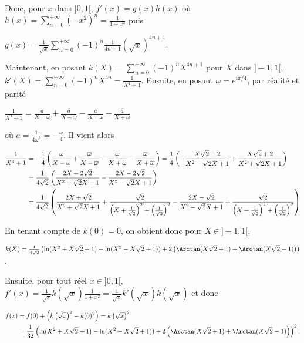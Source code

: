 {{Donc, pour $x$ dans $]0,1[$, $f'(x)  = g(x)h(x)$ où $h(x) =\sum_{n=0}^{+\infty}(-x^2)^n =\frac{1}{1+x^2}$ puis 

\begin{center}
$g(x) =\frac{1}{\sqrt{x}}\sum_{n=0}^{+\infty}(-1)^n\frac{1}{4n+1}(\sqrt{x})^{4n+1}$.
\end{center}

Maintenant, en posant $k(X)=\sum_{n=0}^{+\infty}(-1)^n X^{4n+1}$ pour $X$ dans $]-1,1[$, $k'(X)=\sum_{n=0}^{+\infty}(-1)^nX^{4n}=\frac{1}{X^4+1}$. Ensuite, en posant $\omega=e^{i\pi/4}$, par réalité et parité

\begin{center}
$\frac{1}{X^4+1}=\frac{a}{X-\omega}+\frac{\overline{a}}{X-\overline{\omega}}-\frac{a}{X+\omega}-\frac{\overline{a}}{X+\overline{\omega}}$
\end{center}

où $a=\frac{1}{4\omega^3}=-\frac{\omega}{4}$. Il vient alors

\begin{align*}\ensuremath
\frac{1}{X^4+1}&=-\frac{1}{4}\left(\frac{\omega}{X-\omega}+\frac{\overline{\omega}}{X-\overline{\omega}}-\frac{\omega}{X+\omega}-\frac{\overline{\omega}}{X+\overline{\omega}}\right)=\frac{1}{4}\left(-\frac{X\sqrt{2}-2}{X^2-\sqrt{2}X+1}+\frac{X\sqrt{2}+2}{X^2+\sqrt{2}X+1}\right)\\
 &=\frac{1}{4\sqrt{2}}\left(\frac{2X+2\sqrt{2}}{X^2+\sqrt{2}X+1}-\frac{2X-2\sqrt{2}}{X^2-\sqrt{2}X+1}\right)\\
 &=\frac{1}{4\sqrt{2}}\left(\frac{2X+\sqrt{2}}{X^2+\sqrt{2}X+1}+\frac{\sqrt{2}}{\left(X+\frac{1}{\sqrt{2}}\right)^2+\left(\frac{1}{\sqrt{2}}\right)^2}-\frac{2X-\sqrt{2}}{X^2-\sqrt{2}X+1}+\frac{\sqrt{2}}{\left(X-\frac{1}{\sqrt{2}}\right)^2+\left(\frac{1}{\sqrt{2}}\right)^2}\right)
\end{align*}
 

En tenant compte de $k(0) = 0$, on obtient donc pour $X\in]-1,1[$,

\begin{center}
$k(X) =\frac{1}{4\sqrt{2}}\left(\ln(X^2+X\sqrt{2}+1)-\ln(X^2-X\sqrt{2}+1))+2\left(\Arctan(X\sqrt{2}+1)+\Arctan(X\sqrt{2}-1)\right)\right)$.
\end{center}

Ensuite, pour tout réel $x\in]0,1[$, $f'(x) =\frac{1}{\sqrt{x}}k\left(\sqrt{x}\right)\frac{1}{1+x^2}=\frac{1}{\sqrt{x}}k'\left(\sqrt{x}\right)k\left(\sqrt{x}\right)$ et donc 

\begin{align*}\ensuremath
f(x)&=f(0)+\left(k\left(\sqrt{x}\right)^2 -k(0)^2\right)=k\left(\sqrt{x}\right)^2\\
 &=\frac{1}{32}\left(\ln(X^2+X\sqrt{2}+1)-\ln(X^2-X\sqrt{2}+1))+2\left(\Arctan(X\sqrt{2}+1)+\Arctan(X\sqrt{2}-1)\right)\right)^2.
\end{align*}

}}
